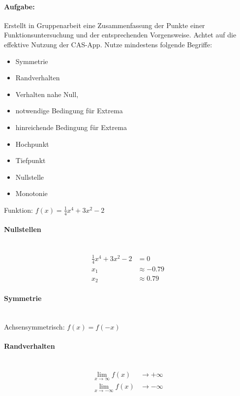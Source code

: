 \documentclass[arbeitsmappe.tex]{subfiles}
\begin{document}
    \paragraph{Aufgabe:} Erstellt in Gruppenarbeit eine Zusammenfassung der Punkte einer Funktionsuntersuchung und der entsprechenden Vorgensweise.
    Achtet auf die effektive Nutzung der CAS-App.
    Nutze mindestens folgende Begriffe:
    \begin{itemize}
        \item Symmetrie
        \item Randverhalten
        \item Verhalten nahe Null,
        \item notwendige Bedingung für Extrema
        \item hinreichende Bedingung für Extrema
        \item Hochpunkt
        \item Tiefpunkt
        \item Nullstelle
        \item Monotonie
    \end{itemize}
    Funktion: $f(x) = \frac{1}{4}x^4 + 3x^2 - 2$
    \\

    \paragraph{Nullstellen} \mbox{} \\
    \begin{align*}
        \frac{1}{4}x^4 + 3x^2 - 2 &= 0 \\
        x_1 &\approx -0.79\\ x_2 &\approx 0.79
    \end{align*}

    \paragraph{Symmetrie} \mbox{} \\
    Achsensymmetrisch: $f(x) = f(-x)$

    \paragraph{Randverhalten} \mbox{} \\
    \begin{align*}
        \lim_{x \to \infty} f(x) &\to +\infty \\
        \lim_{x \to -\infty} f(x) &\to -\infty
    \end{align*}
\end{document}
